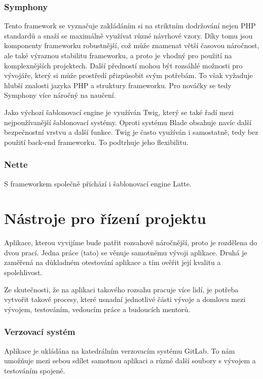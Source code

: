\documentclass[czech,BP]{thesiskiv}
\begin{document}
\subsubsection{Symphony}
\par Tento framework se vyznačuje zakládáním si na striktním dodržování nejen PHP standardů a snaží se maximálně využívat různé návrhové vzory. Díky tomu jsou komponenty frameworku robustnější, což může znamenat větší časovou náročnost, ale také výraznou stabilitu frameworku, a proto je vhodný pro použití na komplexnějších projektech. Další předností mohou být rozsáhlé možnosti pro vývojáře, který si může prostředí přizpůsobit svým potřebám. To však vyžaduje hlubší znalosti jazyka PHP a struktury frameworku. Pro nováčky se tedy Symphony více náročný na naučení.
\par Jako výchozí šablonovací engine je využíván Twig, který se také řadí mezi nejpoužívanější šablonovací systémy. Oproti systému Blade obsahuje navíc další bezpečnostní vrstvu a další funkce. Twig je často využíván i samostatně, tedy bez použití back-end frameworku. To podtrhuje jeho flexibilitu.
\subsubsection{Nette}
\par 
\par S frameworkem společně přichází i šablonovací engine Latte.

\section{Nástroje pro řízení projektu}
\par Aplikace, kterou vyvijíme bude patřit rozsahově náročnější, proto je rozdělena do dvou prací. Jedna práce (tato) se věnuje samotnému vývoji aplikace. Druhá je zaměřená na důkladném otestování aplikace a tím ověřit její kvalitu a spolehlivost.
\par Ze skutečnosti, že na aplikaci takového rozsahu pracuje více lidí, je potřeba vytvořit takové procesy, které usnadní jednotlivé části vývoje a domlovu mezi vývojem, testováním, vedoucím práce a budoucích mentorů.
\subsubsection{Verzovací systém}
\par Aplikace je ukládána na katedrálním verzovacím systému GitLab. To nám umožňuje mezi sebou sdílet samotnou aplikaci a různé další soubory s vývojem a testováním spojené.
\end{document}
